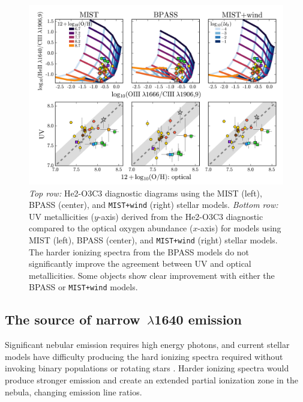 \documentclass[trackchanges, preprint2]{aastex62}
\newcommand{\heii}{\ion{He}{2}}
\begin{document}
\begin{figure}
  \begin{center}
    \includegraphics[width=\linewidth]{figs/f8.png}
    \caption{\emph{Top row:} He2-O3C3 diagnostic diagrams using the MIST (left), BPASS (center), and {\tt MIST+wind} (right) stellar models. \emph{Bottom row:} UV metallicities ($y$-axis) derived from the He2-O3C3 diagnostic compared to the optical oxygen abundance ($x$-axis) for models using MIST (left), BPASS (center), and {\tt MIST+wind} (right) stellar models. The harder ionizing spectra from the BPASS models do not significantly improve the agreement between UV and optical metallicities. Some objects show clear improvement with either the BPASS or {\tt MIST+wind} models.}
    \label{fig:HeIIdds}
  \end{center}
\end{figure}

\subsection{The source of narrow $\,\lambda$1640 emission} \label{sec:discussion:HeII}

Significant nebular \heii{} emission requires high energy photons, and current stellar models have difficulty producing the hard ionizing spectra required without invoking binary populations or rotating stars \citep[e.g.,][]{Stark+2014, Steidel+2016, Choi+2017, Byler+2017}. Harder ionizing spectra would produce stronger \heii{} emission and create an extended partial ionization zone in the nebula, changing emission line ratios.
\end{document}
